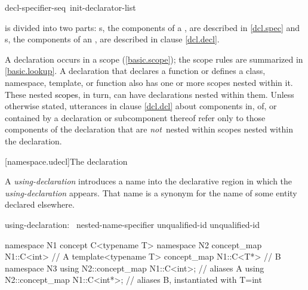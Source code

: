 \documentclass[american]{book}
\begin{document}
\begin{paras}
\begin{ncsimplebnf}
decl-specifier-seq\opt\ init-declarator-list\opt\ \terminal{;}
\end{ncsimplebnf}

\textcolor{black}{}is divided into two parts:
s,
the components of a
,
are described in \ref{dcl.spec} and
s,
the components of an
,
are described in clause \ref{dcl.decl}.

\pnum
A declaration occurs in a scope (\ref{basic.scope});
the scope rules are summarized in \ref{basic.lookup}.
A declaration that declares a function or defines a class,
 namespace, template, 
or function also has one or more scopes nested within it.
These nested \textcolor{black}{scopes}, in
turn, can have declarations nested within them.
Unless otherwise stated,
utterances in clause \ref{dcl.dcl} about components in, of, or contained by a
declaration or subcomponent thereof refer only to those components of the
declaration that are
\textit{not}\ 
nested within scopes nested within the declaration.

\setcounter{section}{3}
\setcounter{subsection}{2}
[namespace.udecl]{The  declaration}

\pnum
A \emph{using-declaration} introduces a name into the declarative
region in which the \emph{using-declaration} appears. That name is a
synonym for the name of some entity declared elsewhere.

\begin{bnf}
using-declaration:\br
       \opt \terminal{::}\opt\ nested-name-specifier unqualified-id \terminal{;}\br
      \terminal{using} \terminal{::} unqualified-id \terminal{;}\br
      \br
      \br
      \addedConcepts{\mbox{\terminal{using} \terminal{::}\opt\ nested-name-specifier\opt\  concept-name \terminal{;}}}
\end{bnf}

\setcounter{Paras}{20}

\pnum 
{}
%
\color{addclr}
\begin{codeblock}
namespace N1 {
  concept C<typename T> { }
}
namespace N2 {
  concept_map N1::C<int> { } // A
  template<typename T> concept_map N1::C<T*> { } // B
}
namespace N3 {
  using N2::concept_map N1::C<int>;  // aliases A
  using N2::concept_map N1::C<int*>; // aliases B, instantiated with T=int
}
\end{codeblock}
\addedConcepts{\mbox{\exitexample}}



\end{paras}
\end{document}
